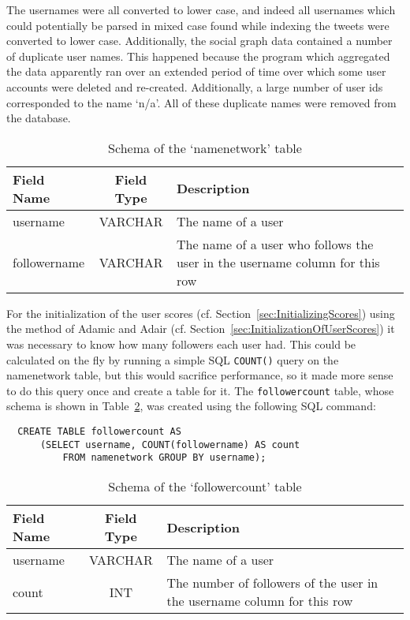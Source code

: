 The usernames were all converted to lower case, and indeed all usernames which could potentially be parsed in mixed case found while indexing the tweets were converted to lower case. Additionally, the social graph data contained a number of duplicate user names. This happened because the program which aggregated the data apparently ran over an extended period of time over which some user accounts were deleted and re-created. Additionally, a large number of user ids corresponded to the name `n/a'. All of these duplicate names were removed from the database.

\begin{table}
\centering
\begin{tabular}{l|c|p{8cm}}
{\bf Field Name} & {\bf Field Type} & {\bf Description} \\ \hline
username & VARCHAR & The name of a user \\ \hline
followername & VARCHAR & The name of a user who follows the user in the username column for this row \\
\end{tabular}
\caption{Schema of the `namenetwork' table}
\label{tab:namenetworkSchema}
\end{table}


For the initialization of the user scores (cf. Section~\ref{sec:InitializingScores}) using the method of Adamic and Adair (cf. Section~\ref{sec:InitializationOfUserScores}) it was necessary to know how many followers each user had. This could be calculated on the fly by running a simple SQL \texttt{COUNT()} query on the namenetwork table, but this would sacrifice performance, so it made more sense to do this query once and create a table for it. The \texttt{followercount} table, whose schema is shown in Table~\ref{tab:followercountSchema}, was created using the following SQL command:

\begin{verbatim}
  CREATE TABLE followercount AS
      (SELECT username, COUNT(followername) AS count
          FROM namenetwork GROUP BY username);
\end{verbatim}

\begin{table}
\centering
\begin{tabular}{l|c|p{8cm}}
{\bf Field Name} & {\bf Field Type} & {\bf Description} \\ \hline
username & VARCHAR & The name of a user \\ \hline
count & INT & The number of followers of the user in the username column for this row \\
\end{tabular}
\caption{Schema of the `followercount' table}
\label{tab:followercountSchema}
\end{table}

